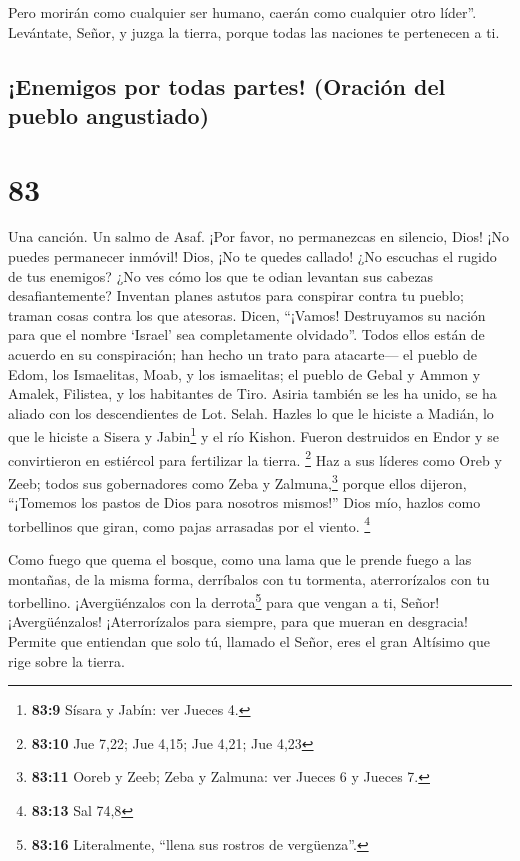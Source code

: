  Pero morirán como cualquier ser humano, caerán como
cualquier otro líder''.  Levántate, Señor, y juzga la
tierra, porque todas las naciones te pertenecen a ti.

\hypertarget{enemigos-por-todas-partes-oraciuxf3n-del-pueblo-angustiado}{%
\subsection{¡Enemigos por todas partes! (Oración del pueblo
angustiado)}\label{enemigos-por-todas-partes-oraciuxf3n-del-pueblo-angustiado}}

\hypertarget{section-82}{%
\section{83}\label{section-82}}

Una canción. Un salmo de Asaf.  ¡Por favor, no permanezcas
en silencio, Dios! ¡No puedes permanecer inmóvil! Dios, ¡No te quedes
callado!  ¿No escuchas el rugido de tus enemigos? ¿No ves
cómo los que te odian levantan sus cabezas desafiantemente?
 Inventan planes astutos para conspirar contra tu pueblo;
traman cosas contra los que atesoras.  Dicen, ``¡Vamos!
Destruyamos su nación para que el nombre `Israel' sea completamente
olvidado''.  Todos ellos están de acuerdo en su
conspiración; han hecho un trato para atacarte---  el
pueblo de Edom, los Ismaelitas, Moab, y los ismaelitas; 
el pueblo de Gebal y Ammon y Amalek, Filistea, y los habitantes de Tiro.
 Asiria también se les ha unido, se ha aliado con los
descendientes de Lot. Selah.  Hazles lo que le hiciste a
Madián, lo que le hiciste a Sisera y Jabin\footnote{\textbf{83:9} Sísara
  y Jabín: ver Jueces 4.} y el río Kishon.  Fueron
destruidos en Endor y se convirtieron en estiércol para fertilizar la
tierra. \footnote{\textbf{83:10} Jue 7,22; Jue 4,15; Jue 4,21; Jue 4,23}
 Haz a sus líderes como Oreb y Zeeb; todos sus
gobernadores como Zeba y Zalmuna,\footnote{\textbf{83:11} Ooreb y Zeeb;
  Zeba y Zalmuna: ver Jueces 6 y Jueces 7.}  porque ellos
dijeron, ``¡Tomemos los pastos de Dios para nosotros mismos!''
 Dios mío, hazlos como torbellinos que giran, como pajas
arrasadas por el viento. \footnote{\textbf{83:13} Sal 74,8}

 Como fuego que quema el bosque, como una lama que le
prende fuego a las montañas,  de la misma forma,
derríbalos con tu tormenta, aterrorízalos con tu torbellino.
 ¡Avergüénzalos con la derrota\footnote{\textbf{83:16}
  Literalmente, ``llena sus rostros de vergüenza''.} para que vengan a
ti, Señor!  ¡Avergüénzalos! ¡Aterrorízalos para siempre,
para que mueran en desgracia!  Permite que entiendan que
solo tú, llamado el Señor, eres el gran Altísimo que rige sobre la
tierra.

